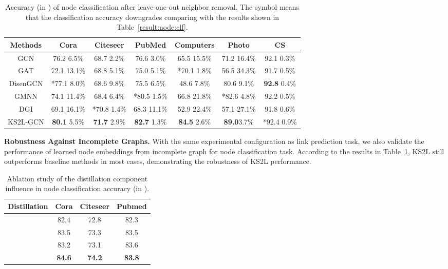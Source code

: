 \documentclass[preprint]{article}
\begin{document}
\begin{table}[!tp]
\caption{Accuracy (in ) of node classification   after leave-one-out neighbor removal. The symbol  means that the classification accuracy downgrades comparing with the results shown in Table~\ref{result:node:clf}.}
\label{result:node:link:clf}
\centering
\begin{adjustbox}{max width=14cm}
\begin{tabular}{c c c c c c c}
\toprule
	\textbf{Methods} & \textbf{Cora} & \textbf{Citeseer} & \textbf{PubMed} & \textbf{Computers} & \textbf{Photo} & \textbf{CS}\\
\midrule
	GCN & 76.2  6.5\% & 68.7  2.2\% & 76.6  3.0\% & 65.5  15.5\% & 71.2  16.4\% &  92.1  0.3\%\\
\midrule
	GAT & 72.1  13.1\%& 68.8  5.1\% & 75.0  5.1\%& *70.1  1.8\% & 56.5  34.3\% & 91.7  0.5\%\\
\midrule
	DisenGCN & *77.1  8.0\% & 68.6 9.8\% & 75.5 6.5\% & 48.6  7.8\% & 80.6  9.1\% & \textbf{92.8}  0.4\%\\
\midrule
	GMNN & 74.1  11.4\% & 68.4  6.4\% & *80.5  1.5\%& 66.8  21.8\% & *82.6  4.8\%& 92.2  0.5\%\\
\midrule
	DGI & 69.1  16.1\% & *70.8  1.4\% & 68.3  11.1\% & 52.9  22.4\% & 57.1  27.1\% & 91.8  0.6\%\\
\midrule
	KS2L-GCN & \textbf{80.1}  5.5\% & \textbf{71.7}  2.9\% & \textbf{82.7} 1.3\%&\textbf{84.5} 2.6\% & \textbf{89.0}3.7\% & *92.4  0.9\%\\
\bottomrule
\end{tabular}
\end{adjustbox}
\end{table}

\textbf{Robustness Against Incomplete Graphs.} With the same experimental configuration as link prediction task, we also validate the performance of learned node embeddings from incomplete graph for node classification task. According to the results in Table~\ref{result:node:link:clf}, KS2L still outperforms baseline methods in most cases,  demonstrating the robustness of KS2L performance.
 
 
\begin{table}
\caption{Ablation study of the distillation component influence in node classification accuracy (in ).}
\label{abl:std}
\centering
\footnotesize
\begin{tabular}{c c c c}
\toprule
	\textbf{Distillation} & \textbf{Cora} & \textbf{Citeseer} & \textbf{Pubmed}\\
\midrule
 & 82.4 & 72.8 & 82.3\\
	  & 83.5 & 73.3 & 83.5\\
  & 83.2 & 73.1 & 83.6\\
		  & {\bf 84.6} & {\bf 74.2} & {\bf 83.8}\\
\bottomrule
\end{tabular}
\vspace{-0.4cm}
\end{table}
\end{document}
